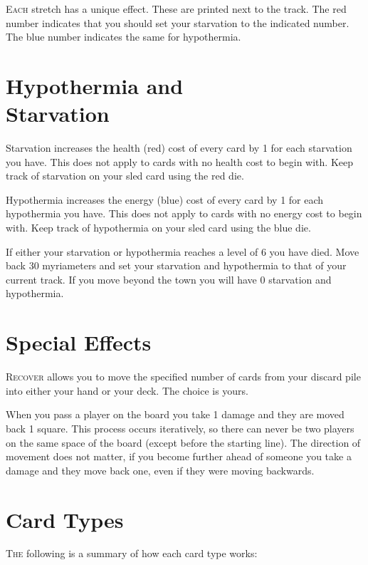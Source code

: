 \documentclass{article}
\begin{document}
\begin{multicols}{3}
    \textsc{Each} stretch has a unique effect. These are printed next
    to the track. The red number indicates that you should set your starvation
    to the indicated number. The blue number indicates the same for hypothermia.

\section{Hypothermia and \\Starvation}

    Starvation increases the health (red) cost of every card by 1 for each
    starvation you have. This does not apply to cards with no health cost to
    begin with. Keep track of starvation on your sled card using the red die.

    Hypothermia increases the energy (blue) cost of every card by 1 for each
    hypothermia you have. This does not apply to cards with no energy cost to
    begin with. Keep track of hypothermia on your sled card using the blue die.

    If either your starvation or hypothermia reaches a level of 6 you have died.
    Move back 30 myriameters and set your starvation and hypothermia to that of
    your current track. If you move beyond the town you will have 0 starvation
    and hypothermia.

\section{Special Effects}

    \textsc{Recover} allows you to move the specified number of cards from your discard
    pile into either your hand or your deck. The choice is yours.

    When you pass a player on the board you take 1 damage and they are moved
    back 1 square. This process occurs iteratively, so there can never be two
    players on the same space of the board (except before the starting line).
    The direction of movement does not matter, if you become further ahead of
    someone you take a damage and they move back one, even if they were moving
    backwards.

\section{Card Types}

    \textsc{The} following is a summary of how each card type works:


\end{multicols}
\end{document}
